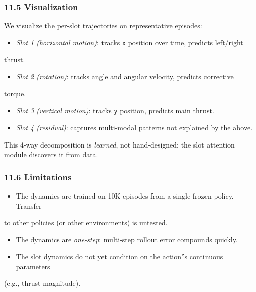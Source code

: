 \documentclass[11pt]{article}
\begin{document}
\subsubsection{11.5 Visualization}

We visualize the per-slot trajectories on representative episodes:

\begin{itemize}
  \item \textit{Slot 1 (horizontal motion)}: tracks \texttt{x} position over time, predicts left/right
\end{itemize}

  thrust.
\begin{itemize}
  \item \textit{Slot 2 (rotation)}: tracks angle and angular velocity, predicts corrective
\end{itemize}

  torque.
\begin{itemize}
  \item \textit{Slot 3 (vertical motion)}: tracks \texttt{y} position, predicts main thrust.
  \item \textit{Slot 4 (residual)}: captures multi-modal patterns not explained by the above.
\end{itemize}


This 4-way decomposition is \textit{learned}, not hand-designed; the slot attention
module discovers it from data.

\subsubsection{11.6 Limitations}

\begin{itemize}
  \item The dynamics are trained on 10K episodes from a single frozen policy. Transfer
\end{itemize}

  to other policies (or other environments) is untested.
\begin{itemize}
  \item The dynamics are \textit{one-step}; multi-step rollout error compounds quickly.
  \item The slot dynamics do not yet condition on the action''s continuous parameters
\end{itemize}

  (e.g., thrust magnitude).

\hrulefill
\end{document}

